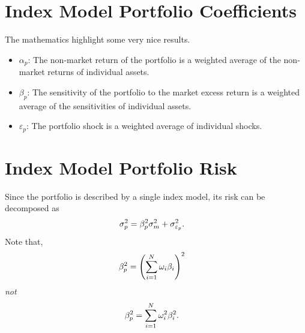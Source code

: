 \documentclass[letterpaper,10pt,english]{sphinxmanual}
\begin{document}
\section{Index Model Portfolio Coefficients}
\label{indexModels:index-model-portfolio-coefficients}
The mathematics highlight some very nice results.
\begin{itemize}
\item {} 
$\alpha_p$: The non-market return of the portfolio is a
weighted average of the non-market returns of individual assets.

\end{itemize}
\begin{itemize}
\item {} 
$\beta_p$: The sensitivity of the portfolio to the market
excess return is a weighted average of the sensitivities of
individual assets.

\end{itemize}
\begin{itemize}
\item {} 
$\varepsilon_p$: The portfolio shock is a weighted average of
individual shocks.

\end{itemize}


\section{Index Model Portfolio Risk}
\label{indexModels:index-model-portfolio-risk}
Since the portfolio is described by a single index model, its risk can
be decomposed as
\begin{gather}
\begin{split}\sigma^2_p & = \beta^2_p \sigma^2_m + \sigma^2_{\varepsilon_p}.\end{split}\notag
\end{gather}
Note that,
\begin{gather}
\begin{split}\beta^2_p & = \left(\sum_{i=1}^N \omega_i \beta_i\right)^2\end{split}\notag
\end{gather}
\emph{not}
\begin{gather}
\begin{split}\beta^2_p & = \sum_{i=1}^N \omega^2_i \beta^2_i.\end{split}\notag
\end{gather}
\end{document}
